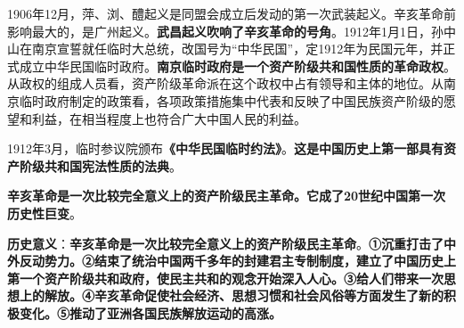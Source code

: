 {{1906年12月，萍、浏、醴起义是同盟会成立后发动的第一次武装起义}。{辛亥革命前影响最大的，是广州起义}。\textbf{{武昌起义吹响了辛亥革命的号角}}。1912年1月1日，{孙中山在南京宣誓就任临时大总统，改国号为``中华民国''}，定1912年为民国元年，并正式成立中华民国临时政府。\textbf{{南京临时政府是一个资产阶级共和国性质的革命政权}}。从政权的组成人员看，资产阶级革命派在这个政权中占有领导和主体的地位。从南京临时政府制定的政策看，各项政策措施集中代表和反映了中国民族资产阶级的愿望和利益，在相当程度上也符合广大中国人民的利益。}

{1912年3月，临时参议院颁布\textbf{{《中华民国临时约法》}}。\textbf{{这是中国历史上第一部具有资产阶级共和国宪法性质的法典}}。}

{\textbf{{辛亥革命是一次比较完全意义上的资产阶级民主革命。它成了}{20}{世纪中国第一次历史性巨变}}。}

{\textbf{{历史意义}}{：}\textbf{{辛亥革命是一次比较完全意义上的资产阶级民主革命}}{。}\textbf{{①沉重打击了中外反动势力。②结束了统治中国两千多年的封建君主专制制度，建立了中国历史上第一个资产阶级共和政府，使民主共和的观念开始深入人心。③给人们带来一次思想上的解放。④辛亥革命促使社会经济、思想习惯和社会风俗等方面发生了新的积极变化。⑤推动了亚洲各国民族解放运动的高涨。}}}
